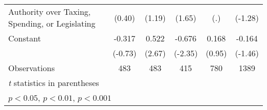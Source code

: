 {\begin{tabular}{l*{5}{c}}
Authority over Taxing, Spending, or Legislating&   (0.40)         &   (1.19)         &   (1.65)         &      (.)         &  (-1.28)         \\
\addlinespace
Constant        &   -0.317         &    0.522\sym{**} &   -0.676\sym{*}  &    0.168         &   -0.164         \\
                &  (-0.73)         &   (2.67)         &  (-2.35)         &   (0.95)         &  (-1.46)         \\
\midrule
Observations    &      483         &      483         &      415         &      780         &     1389         \\
\bottomrule
\multicolumn{6}{l}{\footnotesize \textit{t} statistics in parentheses}\\
\multicolumn{6}{l}{\footnotesize \sym{*} \(p<0.05\), \sym{**} \(p<0.01\), \sym{***} \(p<0.001\)}\\
\end{tabular}
}
